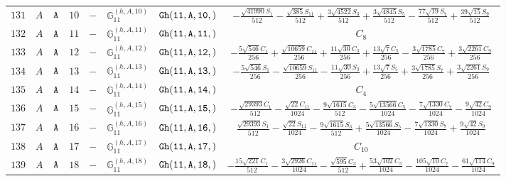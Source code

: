 \documentclass[fleqn,8pt]{jsarticle}
\begin{document}
\begin{table}[ht!]
\begin{center}
\begin{tabular}{cccccccc}
$ 131 $ & $ A $ & $ {\tt A} $ & $ 10 $ & $ - $ & $ \mathbb{G}_{11}^{(h,A,10)} $ & $ {\tt Gh(11,A,10,)} $ & $ - \frac{\sqrt{41990} S_{1}}{512} - \frac{\sqrt{385} S_{11}}{512} + \frac{3 \sqrt{4522} S_{3}}{512} + \frac{3 \sqrt{4845} S_{5}}{512} - \frac{77 \sqrt{19} S_{7}}{512} + \frac{39 \sqrt{15} S_{9}}{512} $ \\
$ 132 $ & $ A $ & $ {\tt A} $ & $ 11 $ & $ - $ & $ \mathbb{G}_{11}^{(h,A,11)} $ & $ {\tt Gh(11,A,11,)} $ & $ C_{8} $ \\
$ 133 $ & $ A $ & $ {\tt A} $ & $ 12 $ & $ - $ & $ \mathbb{G}_{11}^{(h,A,12)} $ & $ {\tt Gh(11,A,12,)} $ & $ - \frac{5 \sqrt{546} C_{1}}{256} + \frac{\sqrt{10659} C_{11}}{256} + \frac{11 \sqrt{30} C_{3}}{256} + \frac{13 \sqrt{7} C_{5}}{256} - \frac{3 \sqrt{1785} C_{7}}{256} + \frac{3 \sqrt{2261} C_{9}}{256} $ \\
$ 134 $ & $ A $ & $ {\tt A} $ & $ 13 $ & $ - $ & $ \mathbb{G}_{11}^{(h,A,13)} $ & $ {\tt Gh(11,A,13,)} $ & $ - \frac{5 \sqrt{546} S_{1}}{256} - \frac{\sqrt{10659} S_{11}}{256} - \frac{11 \sqrt{30} S_{3}}{256} + \frac{13 \sqrt{7} S_{5}}{256} + \frac{3 \sqrt{1785} S_{7}}{256} + \frac{3 \sqrt{2261} S_{9}}{256} $ \\
$ 135 $ & $ A $ & $ {\tt A} $ & $ 14 $ & $ - $ & $ \mathbb{G}_{11}^{(h,A,14)} $ & $ {\tt Gh(11,A,14,)} $ & $ C_{4} $ \\
$ 136 $ & $ A $ & $ {\tt A} $ & $ 15 $ & $ - $ & $ \mathbb{G}_{11}^{(h,A,15)} $ & $ {\tt Gh(11,A,15,)} $ & $ - \frac{\sqrt{29393} C_{1}}{512} - \frac{\sqrt{22} C_{11}}{1024} - \frac{9 \sqrt{1615} C_{3}}{512} - \frac{5 \sqrt{13566} C_{5}}{1024} - \frac{7 \sqrt{1330} C_{7}}{1024} - \frac{9 \sqrt{42} C_{9}}{1024} $ \\
$ 137 $ & $ A $ & $ {\tt A} $ & $ 16 $ & $ - $ & $ \mathbb{G}_{11}^{(h,A,16)} $ & $ {\tt Gh(11,A,16,)} $ & $ \frac{\sqrt{29393} S_{1}}{512} - \frac{\sqrt{22} S_{11}}{1024} - \frac{9 \sqrt{1615} S_{3}}{512} + \frac{5 \sqrt{13566} S_{5}}{1024} - \frac{7 \sqrt{1330} S_{7}}{1024} + \frac{9 \sqrt{42} S_{9}}{1024} $ \\
$ 138 $ & $ A $ & $ {\tt A} $ & $ 17 $ & $ - $ & $ \mathbb{G}_{11}^{(h,A,17)} $ & $ {\tt Gh(11,A,17,)} $ & $ C_{10} $ \\
$ 139 $ & $ A $ & $ {\tt A} $ & $ 18 $ & $ - $ & $ \mathbb{G}_{11}^{(h,A,18)} $ & $ {\tt Gh(11,A,18,)} $ & $ - \frac{15 \sqrt{221} C_{1}}{512} - \frac{3 \sqrt{2926} C_{11}}{1024} - \frac{\sqrt{595} C_{3}}{512} + \frac{53 \sqrt{102} C_{5}}{1024} - \frac{105 \sqrt{10} C_{7}}{1024} - \frac{61 \sqrt{114} C_{9}}{1024} $ \\

\end{tabular}
\end{center}
\end{table}
\end{document}
